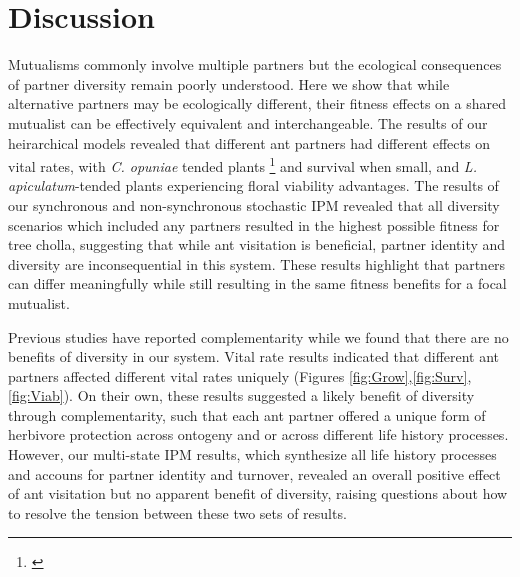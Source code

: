 \documentclass[11pt]{article}
\newcommand{\tom}[2]{{\color{red}{#1}}\footnote{\textit{\color{red}{#2}}}}
\begin{document}
\section*{Discussion}
Mutualisms commonly involve multiple partners but the ecological consequences of partner diversity remain poorly understood. 
Here we show that while alternative partners may be ecologically different, their fitness effects on a shared mutualist can be effectively equivalent and interchangeable.
The results of our heirarchical models revealed that different ant partners had different effects on vital rates, with \textit{C. opuniae} tended plants \tom{experiencing slight advantages in growth}{I don't think this is true if you look at my v1 figure.} and survival when small, and \textit{L. apiculatum}-tended plants experiencing floral viability advantages.
The results of our synchronous and non-synchronous stochastic IPM revealed that all diversity scenarios which included any partners resulted in the highest possible fitness for tree cholla, suggesting that while ant visitation is beneficial, partner identity and diversity are inconsequential in this system. 
These results highlight that partners can differ meaningfully while still resulting in the same fitness benefits for a focal mutualist.

Previous studies have reported complementarity \citep{Palmer2010,Rezende2007,Afkhami2021} while we found that there are no benefits of diversity in our system.
Vital rate results indicated that different ant partners affected different vital rates uniquely (Figures \ref{fig:Grow},\ref{fig:Surv},\ref{fig:Viab}).
On their own, these results suggested a likely benefit of diversity through complementarity, such that each ant partner offered a unique form of herbivore protection across ontogeny and or across different life history processes. 
However, our multi-state IPM results, which synthesize all life history processes and accouns for partner identity and turnover, revealed an overall positive effect of ant visitation but no apparent benefit of diversity, raising questions about how to resolve the tension between these two sets of results. 
\end{document}
